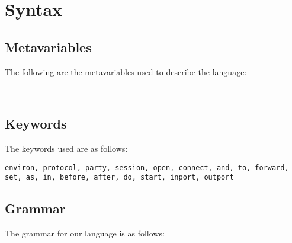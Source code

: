 
\section{Syntax}
\label{sec:syntax-test}

\subsection{Metavariables}
\label{sec:metavar}
The following are the metavariables used to describe the language:

\ottmetavars\\[0pt]

\subsection{Keywords}
The keywords used are as follows:

\texttt{environ, protocol, party, session, open, connect, and, to, forward, set, as, in,
before, after, do, start, inport, outport}

\subsection{Grammar}
The grammar for our language is as follows:
\bigskip

\ottgrammar
